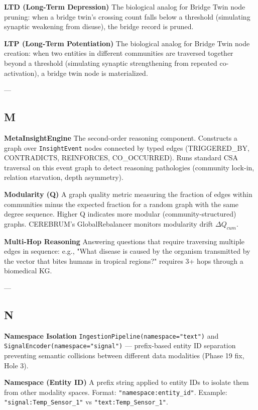 \documentclass[11pt,article,oneside]{memoir}
\begin{document}
\textbf{LTD (Long-Term Depression)}
The biological analog for Bridge Twin node pruning: when a bridge twin's crossing count falls below a threshold (simulating synaptic weakening from disuse), the bridge record is pruned.

\textbf{LTP (Long-Term Potent\-iation)}
The biological analog for Bridge Twin node creation: when two entities in different communities are traversed together beyond a threshold (simulating synaptic stren\-gthening from repeated co-activation), a bridge twin node is mater\-ialized.

---

\subsection{M}

\textbf{MetaInsightEngine}
The second-order reasoning component. Constructs a graph over \texttt{InsightEvent} nodes connected by typed edges (TRIGGERED\_BY, CONTRADICTS, REINFORCES, CO\_OCCURRED). Runs standard CSA traversal on this event graph to detect reasoning pathologies (community lock-in, relation starvation, depth asymmetry).

\textbf{Modularity (Q)}
A graph quality metric measuring the fraction of edges within communities minus the expected fraction for a random graph with the same degree sequence. Higher Q indicates more modular (community-structured) graphs. CEREBRUM's GlobalRebalancer monitors modularity drift $\Delta Q_{cum}$.

\textbf{Multi-Hop Reasoning}
Answering questions that require traversing multiple edges in sequence: e.g., "What disease is caused by the organism transmitted by the vector that bites humans in tropical regions?" requires 3+ hops through a biomedical KG.

---

\subsection{N}

\textbf{Namespace Isolation}
\texttt{IngestionPipeline(namespace="text")} and \texttt{SignalEncoder(namespace="signal")} — prefix-based entity ID separation preventing semantic collisions between different data modalities (Phase 19 fix, Hole 3).

\textbf{Namespace (Entity ID)}
A prefix string applied to entity IDs to isolate them from other modality spaces. Format: \texttt{"namespace:entity\_id"}. Example: \texttt{"signal:Temp\_Sensor\_1"} vs \texttt{"text:Temp\_Sensor\_1"}.
\end{document}
